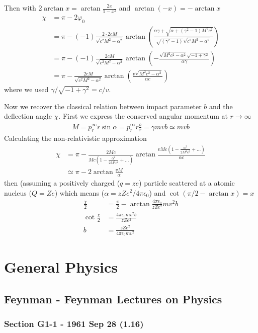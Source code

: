 \documentclass[10pt,a4paper]{book}
\theoremstyle{definition}
\begin{document}
Then with $2\arctan x =\arctan\frac{2x}{1-x^2}$ and $\arctan(-x)=-\arctan x$
\begin{align}
\chi&=\pi-2\varphi_0\\
&=\pi-(-1)\frac{2\cdot2 c M}{\sqrt{c^2 M^2-\alpha ^2}} \arctan\left(\frac{\alpha  \gamma + \sqrt{\alpha
+\left(\gamma ^2-1\right) M^2c^2}}{\sqrt{ \left(\gamma^2-1\right)} \sqrt{c^2 M^2-\alpha ^2}}\right)\\
&=\pi-(-1)\frac{2 c M}{\sqrt{c^2 M^2-\alpha ^2}} \arctan\left(-\frac{\sqrt{M^2c^2-\alpha^2}\sqrt{-1+\gamma^2}}{\alpha\gamma}\right)\\
&=\pi-\frac{2 c M}{\sqrt{c^2 M^2-\alpha ^2}} \arctan\left(\frac{v\sqrt{M^2c^2-\alpha^2}}{\alpha c}\right)
\end{align}
where we used $\gamma/\sqrt{-1+\gamma^2}=c/v$.

Now we recover the classical relation between impact parameter $b$ and the deflection angle $\chi$. First we express the conserved angular momentum at $r\rightarrow\infty$
\begin{align}
M=p_r^\infty r \sin\alpha=p_r^\infty r\frac{b}{r}=\gamma m vb\simeq mvb
\end{align}
Calculating the non-relativistic approximation
\begin{align}
\chi
&=\pi-\frac{2Mc}{Mc\left(1-\frac{\alpha^2}{2M^2c^2}+...\right)}\arctan\frac{vMc\left(1-\frac{\alpha^2}{2M^2c^2}+...\right)}{\alpha c}\\
&\simeq\pi-2\arctan\frac{vM}{\alpha}
\end{align}
then (assuming a positively charged ($q=ze$) particle scattered at a atomic nucleus ($Q=Ze$) which means ($\alpha=zZe^2/4\pi\epsilon_0$) and $\cot\left(\pi/2-\arctan x\right)=x$
\begin{align}
\frac{\chi}{2}&=\frac{\pi}{2}-\arctan \frac{4\pi\epsilon_0}{zZe^2}mv^2b\\
\cot\frac{\chi}{2}&=\frac{4\pi\epsilon_0mv^2b}{zZe^2}\\
b&=\frac{zZe^2}{4\pi\epsilon_0mv^2}
\end{align}


\chapter{General Physics}

\section{{\sc Feynman} - Feynman Lectures on Physics}
\subsection{Section G1-1 - 1961 Sep 28 (1.16)}
\end{document}
